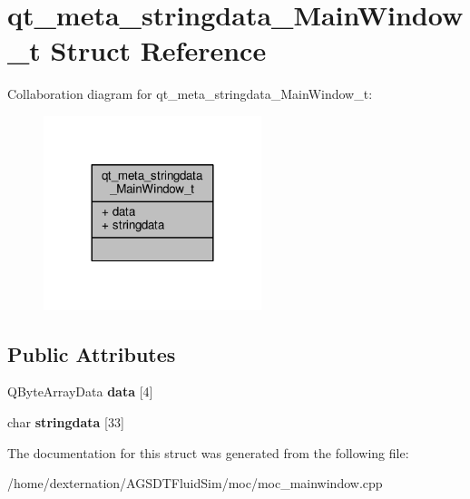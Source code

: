 \hypertarget{structqt__meta__stringdata___main_window__t}{\section{qt\-\_\-meta\-\_\-stringdata\-\_\-\-Main\-Window\-\_\-t Struct Reference}
\label{structqt__meta__stringdata___main_window__t}
}


Collaboration diagram for qt\-\_\-meta\-\_\-stringdata\-\_\-\-Main\-Window\-\_\-t\-:\nopagebreak
\begin{figure}[H]
\begin{center}
\leavevmode
\includegraphics[width=180pt]{structqt__meta__stringdata___main_window__t__coll__graph}
\end{center}
\end{figure}
\subsection*{Public Attributes}
\begin{DoxyCompactItemize}
\item 
\hypertarget{structqt__meta__stringdata___main_window__t_a332d7fa058028f7613b5ba68abb5a7fe}{Q\-Byte\-Array\-Data {\bfseries data} \mbox{[}4\mbox{]}}\label{structqt__meta__stringdata___main_window__t_a332d7fa058028f7613b5ba68abb5a7fe}

\item 
\hypertarget{structqt__meta__stringdata___main_window__t_a8680db759276041c75c0659f4ae8e63c}{char {\bfseries stringdata} \mbox{[}33\mbox{]}}\label{structqt__meta__stringdata___main_window__t_a8680db759276041c75c0659f4ae8e63c}

\end{DoxyCompactItemize}


The documentation for this struct was generated from the following file\-:\begin{DoxyCompactItemize}
\item 
/home/dexternation/\-A\-G\-S\-D\-T\-Fluid\-Sim/moc/moc\-\_\-mainwindow.\-cpp\end{DoxyCompactItemize}
